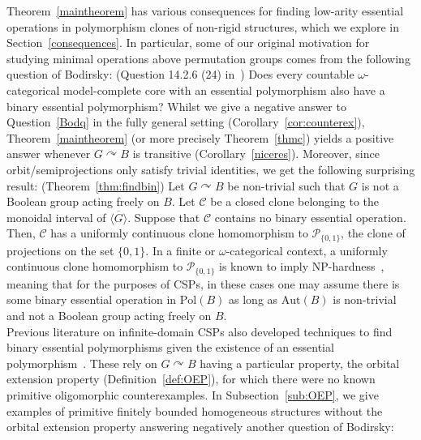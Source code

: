 \documentclass{article}
\newenvironment{customthm}[1]
  {\renewcommand\theinnercustomthm{#1}\innercustomthm}
  {\endinnercustomthm}
\theoremstyle{remark}
\theoremstyle{definition}
\newenvironment{customq}[1]
  {\renewcommand\theinnercustomq{#1}\innercustomq}
  {\endinnercustomq}
\def\acts{\curvearrowright}
\begin{document}
Theorem~\ref{maintheorem} has various consequences for finding low-arity essential operations in polymorphism clones of non-rigid structures, which we explore in Section~\ref{consequences}. In particular, some of our original motivation for studying minimal operations above permutation groups comes from the following question of Bodirsky:
\begin{customq}{1}({Question 14.2.6  (24) in~\cite{BodCSP}})\label{Bodq} Does every countable $\omega$-categorical model-complete core with an essential polymorphism also have a binary essential polymorphism?
\end{customq}
 Whilst we give a negative answer to Question~\ref{Bodq} in the fully general setting (Corollary~\ref{cor:counterex}), Theorem~\ref{maintheorem} (or more precisely Theorem~\ref{thmc}) yields a positive answer whenever $G\acts B$ is transitive (Corollary~\ref{niceres}). Moreover, since orbit\-/semiprojections only satisfy trivial identities, we get the following surprising result:
\begin{customthm}{B}(Theorem~\ref{thm:findbin})\label{mainthmb}
 Let $G\acts B$ be non-trivial such that $G$ is not a Boolean group acting freely on $B$. Let $\mathcal{C}$ be a closed clone belonging to the  monoidal interval of  $\overline{\langle G \rangle}$. Suppose that $\mathcal{C}$ contains no binary essential operation. Then, $\mathcal{C}$ has a uniformly continuous clone 
 homomorphism to $\mathcal{P}_{\{0,1\}}$, the clone of projections on the set $\{0,1\}$.
\end{customthm}
In a finite or $\omega$-categorical context, a uniformly continuous 
 clone homomorphism to $\mathcal{P}_{\{0,1\}}$ is known to imply NP-hardness~\cite{Topo-Birk}, meaning that for the purposes of CSPs, in these cases one may assume there is some binary essential operation in $\mathrm{Pol}(B)$ as long as $\mathrm{Aut}(B)$ is non-trivial and not a Boolean group acting freely on $B$.\\

Previous literature on infinite-domain CSPs also developed techniques to find binary essential polymorphisms given the existence of an essential polymorphism~\cite{BodKara, minrandom, Smoothapp}. These rely on $G\acts B$ having a particular property, the orbital extension property (Definition~\ref{def:OEP}), for which there were no known primitive oligomorphic counterexamples. In Subsection~\ref{sub:OEP}, we give examples of primitive finitely bounded homogeneous structures without the orbital extension property answering negatively another question of Bodirsky:
\end{document}
